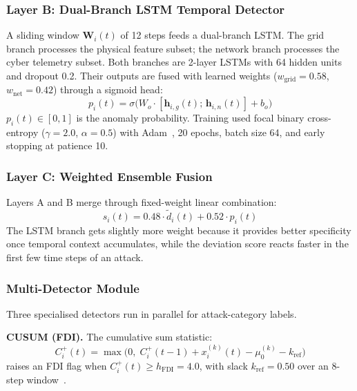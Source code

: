 \documentclass[conference,a4paper]{IEEEtran}
\begin{document}
\subsubsection{Layer B: Dual-Branch LSTM Temporal Detector}

A sliding window $\mathbf{W}_i(t)$ of 12 steps feeds a dual-branch LSTM. The grid branch processes the physical feature subset; the network branch processes the cyber telemetry subset. Both branches are 2-layer LSTMs with 64 hidden units and dropout 0.2. Their outputs are fused with learned weights ($w_{\text{grid}}=0.58$, $w_{\text{net}}=0.42$) through a sigmoid head:
\begin{equation}
p_i(t) = \sigma\!\bigl(W_o \cdot [\mathbf{h}_{i,g}(t);\, \mathbf{h}_{i,n}(t)] + b_o\bigr)
\label{eq:lstm}
\end{equation}
$p_i(t) \in [0,1]$ is the anomaly probability. Training used focal binary cross-entropy ($\gamma=2.0$, $\alpha=0.5$) with Adam~\cite{b16}, 20 epochs, batch size 64, and early stopping at patience 10.

\subsubsection{Layer C: Weighted Ensemble Fusion}

Layers A and B merge through fixed-weight linear combination:
\begin{equation}
s_i(t) = 0.48 \cdot \tilde{d}_i(t) + 0.52 \cdot p_i(t)
\label{eq:ensemble}
\end{equation}
The LSTM branch gets slightly more weight because it provides better specificity once temporal context accumulates, while the deviation score reacts faster in the first few time steps of an attack.

\subsubsection{Multi-Detector Module}

Three specialised detectors run in parallel for attack-category labels.

\textbf{CUSUM (FDI).} The cumulative sum statistic:
\begin{equation}
C_i^+(t) = \max\!\bigl(0,\; C_i^+(t{-}1) + x_i^{(k)}(t) - \mu_0^{(k)} - k_{\text{ref}}\bigr)
\label{eq:cusum}
\end{equation}
raises an FDI flag when $C_i^+(t) \geq h_{\text{FDI}} = 4.0$, with slack $k_{\text{ref}}=0.50$ over an 8-step window~\cite{b2}.
\end{document}
